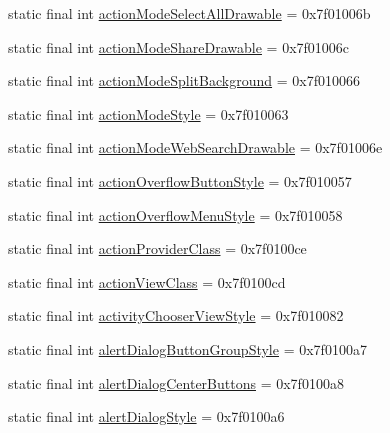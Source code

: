 \begin{CompactItemize}
\item 
static final int \hyperlink{classandroid_1_1support_1_1coreutils_1_1_r_1_1attr_596f5da4acff9096eb6d62dd734e0846}{actionModeSelectAllDrawable} = 0x7f01006b
\item 
static final int \hyperlink{classandroid_1_1support_1_1coreutils_1_1_r_1_1attr_4aa9e9dc3884e73546f550993b8e3ffa}{actionModeShareDrawable} = 0x7f01006c
\item 
static final int \hyperlink{classandroid_1_1support_1_1coreutils_1_1_r_1_1attr_9fe80f793942c0ed72df999de10a0d2b}{actionModeSplitBackground} = 0x7f010066
\item 
static final int \hyperlink{classandroid_1_1support_1_1coreutils_1_1_r_1_1attr_d0255ac1b049481f274376c50334c7cd}{actionModeStyle} = 0x7f010063
\item 
static final int \hyperlink{classandroid_1_1support_1_1coreutils_1_1_r_1_1attr_b6cc24a004cbcdd8af957a1972cbd722}{actionModeWebSearchDrawable} = 0x7f01006e
\item 
static final int \hyperlink{classandroid_1_1support_1_1coreutils_1_1_r_1_1attr_3da536ac79b7692d2d7ba5cad75ac3b7}{actionOverflowButtonStyle} = 0x7f010057
\item 
static final int \hyperlink{classandroid_1_1support_1_1coreutils_1_1_r_1_1attr_593268e51fa4f4270e43bdd94bc87a6d}{actionOverflowMenuStyle} = 0x7f010058
\item 
static final int \hyperlink{classandroid_1_1support_1_1coreutils_1_1_r_1_1attr_2bfa032ca9e9a7f43040d26d6db7f06e}{actionProviderClass} = 0x7f0100ce
\item 
static final int \hyperlink{classandroid_1_1support_1_1coreutils_1_1_r_1_1attr_61e50c4349e4fa0a53fb8bf79e0ba272}{actionViewClass} = 0x7f0100cd
\item 
static final int \hyperlink{classandroid_1_1support_1_1coreutils_1_1_r_1_1attr_f6078a1eff17e4ae15eb3a7b7c698025}{activityChooserViewStyle} = 0x7f010082
\item 
static final int \hyperlink{classandroid_1_1support_1_1coreutils_1_1_r_1_1attr_f0cde740396136dbe2646efc444829ba}{alertDialogButtonGroupStyle} = 0x7f0100a7
\item 
static final int \hyperlink{classandroid_1_1support_1_1coreutils_1_1_r_1_1attr_8c8ab3e6883120e1fc3aee013419a5e1}{alertDialogCenterButtons} = 0x7f0100a8
\item 
static final int \hyperlink{classandroid_1_1support_1_1coreutils_1_1_r_1_1attr_6e574d99768459eb69fdfdef7e9c5c37}{alertDialogStyle} = 0x7f0100a6
\item 

\end{CompactItemize}

